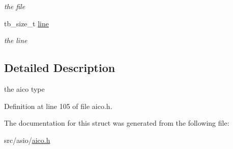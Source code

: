 \begin{DoxyCompactItemize}
\begin{DoxyCompactList}\small\item\em the file \end{DoxyCompactList}\item 
\hypertarget{structtb__aico__t_a934c1b49fc8a512a98984899104639ef}{tb\-\_\-size\-\_\-t \hyperlink{structtb__aico__t_a934c1b49fc8a512a98984899104639ef}{line}}\label{structtb__aico__t_a934c1b49fc8a512a98984899104639ef}

\begin{DoxyCompactList}\small\item\em the line \end{DoxyCompactList}\end{DoxyCompactItemize}


\subsection{Detailed Description}
the aico type 

Definition at line 105 of file aico.\-h.



The documentation for this struct was generated from the following file\-:\begin{DoxyCompactItemize}
\item 
src/asio/\hyperlink{aico_8h}{aico.\-h}\end{DoxyCompactItemize}
